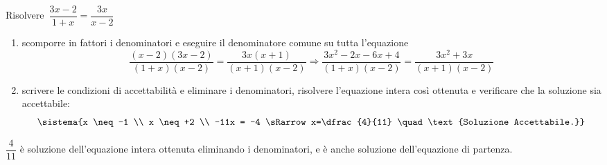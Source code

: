 % 
% 
% 

 \begin{esempio}{}{}
Risolvere~\(\dfrac{3x-2}{1+x}=\dfrac{3x}{x-2}\)

\begin{enumerate}[left=0mm, nosep]
\item scomporre in fattori i denominatori e eseguire il  denominatore 
comune su tutta l'equazione
\[\frac{(x-2)(3x-2)}{(1+x)(x-2)}=\frac{3x(x+1)}{(x+1)(x-2)}\Rightarrow
\frac{3x^{2}-2x-6x+4}{(1+x)(x-2)}=\frac{3x^2+3x}{(x+1)(x-2)}\]
\item scrivere le condizioni di accettabilità e eliminare i 
denominatori, risolvere l'equazione intera così ottenuta e verificare 
che la soluzione sia accettabile:
\[\sistema{x \neq -1 \\ 
           x \neq +2 \\ 
           -11x = -4 \sRarrow x=\dfrac{4}{11} \quad 
             \text{Soluzione Accettabile.}}\]
\end{enumerate}
\(\dfrac{4}{11}\) è soluzione dell'equazione intera ottenuta eliminando 
i denominatori, e è anche soluzione dell'equazione di partenza.
 \end{esempio}


